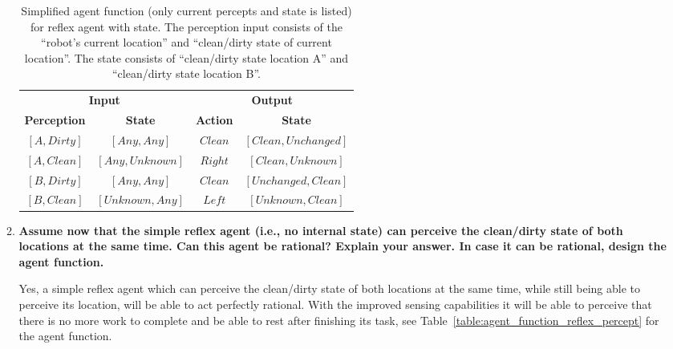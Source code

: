 \begin{enumerate}
\begin{enumerate}
\begin{table}
\begin{center}
\begin{tabular}{cc|cc}
\multicolumn{2}{c|}{\bfseries{Input}} & \multicolumn{2}{c}{\bfseries{Output}}\\
\bfseries{Perception} & \bfseries{State} & \bfseries{Action} & \bfseries{State}\\
\hline
$\mathit{[A, Dirty]}$ & $\mathit{[Any, Any]}$ & $\mathit{Clean}$ & $\mathit{[Clean, Unchanged]}$ \\
$\mathit{[A, Clean]}$ & $\mathit{[Any, Unknown]}$ & $\mathit{Right}$ & $\mathit{[Clean, Unknown]}$ \\
$\mathit{[B, Dirty]}$ & $\mathit{[Any, Any]}$ & $\mathit{Clean}$ & $\mathit{[Unchanged, Clean]}$ \\
$\mathit{[B, Clean]}$ & $\mathit{[Unknown, Any]}$ & $\mathit{Left}$ & $\mathit{[Unknown, Clean]}$ \\
\end{tabular}
\caption{Simplified agent function (only current percepts and state is listed) for reflex agent with state. The perception input consists of the ``robot's current location'' and ``clean/dirty state of current location''. The state consists of ``clean/dirty state location A'' and ``clean/dirty state location B''. }
\label{table:agent_function_reflex_state}
\end{center}
\end{table}

\item \textbf{Assume now that the simple reflex agent (i.e., no internal state) can perceive the clean/dirty state of both locations at the same time. Can this agent be rational? Explain your answer. In case it can be rational, design the agent function.}

Yes, a simple reflex agent which can perceive the clean/dirty state of both locations at the same time, while still being able to perceive its location, will be able to act perfectly rational. With the improved sensing capabilities it will be able to perceive that there is no more work to complete and be able to rest after finishing its task, see Table~\ref{table:agent_function_reflex_percept} for the agent function.


\end{enumerate}
\end{enumerate}
